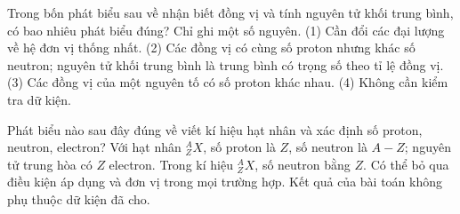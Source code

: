 \begin{ex}
Trong bốn phát biểu sau về nhận biết đồng vị và tính nguyên tử khối trung bình, có bao nhiêu phát biểu đúng? Chỉ ghi một số nguyên. (1) Cần đổi các đại lượng về hệ đơn vị thống nhất. (2) Các đồng vị có cùng số proton nhưng khác số neutron; nguyên tử khối trung bình là trung bình có trọng số theo tỉ lệ đồng vị. (3) Các đồng vị của một nguyên tố có số proton khác nhau. (4) Không cần kiểm tra dữ kiện.
\end{ex}

\begin{ex}
Phát biểu nào sau đây đúng về viết kí hiệu hạt nhân và xác định số proton, neutron, electron?
\choice
{\True Với hạt nhân $^{A}_{Z}X$, số proton là $Z$, số neutron là $A-Z$; nguyên tử trung hòa có $Z$ electron.}
{Trong kí hiệu $^{A}_{Z}X$, số neutron bằng $Z$.}
{Có thể bỏ qua điều kiện áp dụng và đơn vị trong mọi trường hợp.}
{Kết quả của bài toán không phụ thuộc dữ kiện đã cho.}
\end{ex}

